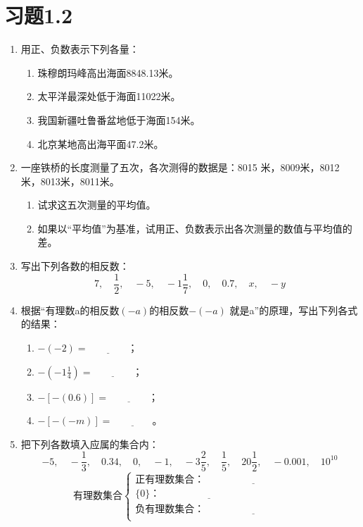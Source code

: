 \section*{习题1.2}
\begin{enumerate}
	\item 用正、负数表示下列各量：
	\begin{enumerate}
		\item 珠穆朗玛峰高出海面8848.13米。
		\item 太平洋最深处低于海面11022米。
		\item 我国新疆吐鲁番盆地低于海面154米。
		\item 北京某地高出海平面47.2米。
	\end{enumerate}
	\item 一座铁桥的长度测量了五次，各次测得的数据是：8015
	米，8009米，8012米，8013米，8011米。
	\begin{enumerate}
		\item 试求这五次测量的平均值。
		\item 如果以“平均值”为基准，试用正、负数表示出各次测量的数值与平均值的差。
	\end{enumerate}
	\item 写出下列各数的相反数：
	\[7,\quad \frac{1}{2},\quad -5,\quad -1\frac{1}{7},\quad 0,\quad 0.7,\quad x,\quad -y  \]
	\item 根据“有理数a的相反数$(- a)$的相反数$-(-a)$
	就是a”的原理，写出下列各式的结果：
	\begin{enumerate}
		\item $-(-2)=\underline{\qquad\qquad}$；
		\item $-\left(-1\frac{1}{4}\right)=\underline{\qquad\qquad}$；
		\item $-[-(0.6)]=\underline{\qquad\qquad}$；
		\item $-[-(-m)]=\underline{\qquad\qquad}$。
	\end{enumerate}
	\item 把下列各数填入应属的集合内：
	\[-5,\quad -\frac{1}{3},\quad 0.34,\quad 0,\quad -1,\quad -3\frac{2}{5},\quad \frac{1}{5},\quad 20\frac{1}{2},\quad -0.001,\quad 10^{10} \]
	\[\text{有理数集合}\begin{cases}
	\text{正有理数集合：}\underline{\qquad\qquad\qquad\qquad\qquad}\\
	\{0\}： \underline{\qquad\qquad\qquad\qquad\qquad}\\    
	\text{负有理数集合：}\underline{\qquad\qquad\qquad\qquad\qquad}\\
	\end{cases}\]
	

\end{enumerate}
